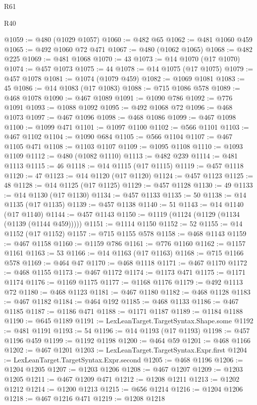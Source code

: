 \begin{lexlean}{R61}
\begin{lexlean}{R40}
\begin{coremodule}
{{{{{{{{{{{{{{{{{{{{{{{{{{{{{{{{{{{{{{{{{{{{{{{{{{{{{{{{{{{{{{{{{{{{{{{{{{{{{{{{{{{{{{{{{{{{{{{{{{{{{{{{{{{{{@1059 := @480 (@1029 @1057)
@1060 := @482 @65
@1062 := @481 @1060 @459
@1065 := @492 @1060 @72 @471
@1067 := @480 (@1062 @1065)
@1068 := @482 @225
@1069 := @481 @1068
@1070 := 43
@1073 := @14 @1070 (@17 @1070)
@1074 := @457 @1073
@1075 := 44
@1078 := @14 @1075 (@17 @1075)
@1079 := @457 @1078
@1081 := @1074 (@1079 @459)
@1082 := @1069 @1081
@1083 := 45
@1086 := @14 @1083 (@17 @1083)
@1088 := @715 @1086 @578
@1089 := @468 @1078
@1090 := @467 @1089
@1091 := @1090 @786
@1092 := @776 @1091
@1093 := @1088 @1092
@1095 := @492 @1068 @72
@1096 := @468 @1073
@1097 := @467 @1096
@1098 := @468 @1086
@1099 := @467 @1098
@1100 := @1099 @471
@1101 := @1097 @1100
@1102 := @566 @1101
@1103 := @467 @1102
@1104 := @1090 @684
@1105 := @566 @1104
@1107 := @467 @1105 @471
@1108 := @1103 @1107
@1109 := @1095 @1108
@1110 := @1093 @1109
@1112 := @480 (@1082 @1110)
@1113 := @482 @239
@1114 := @481 @1113
@1115 := 46
@1118 := @14 @1115 (@17 @1115)
@1119 := @457 @1118
@1120 := 47
@1123 := @14 @1120 (@17 @1120)
@1124 := @457 @1123
@1125 := 48
@1128 := @14 @1125 (@17 @1125)
@1129 := @457 @1128
@1130 := 49
@1133 := @14 @1130 (@17 @1130)
@1134 := @457 @1133
@1135 := 50
@1138 := @14 @1135 (@17 @1135)
@1139 := @457 @1138
@1140 := 51
@1143 := @14 @1140 (@17 @1140)
@1144 := @457 @1143
@1150 := @1119 (@1124 (@1129 (@1134 (@1139 (@1144 @459)))))
@1151 := @1114 @1150
@1152 := 52
@1155 := @14 @1152 (@17 @1152)
@1157 := @715 @1155 @578
@1158 := @468 @1143
@1159 := @467 @1158
@1160 := @1159 @786
@1161 := @776 @1160
@1162 := @1157 @1161
@1163 := 53
@1166 := @14 @1163 (@17 @1163)
@1168 := @715 @1166 @578
@1169 := @464 @47
@1170 := @468 @1118
@1171 := @467 @1170
@1172 := @468 @1155
@1173 := @467 @1172
@1174 := @1173 @471
@1175 := @1171 @1174
@1176 := @1169 @1175
@1177 := @1168 @1176
@1179 := @492 @1113 @72
@1180 := @468 @1123
@1181 := @467 @1180
@1182 := @468 @1128
@1183 := @467 @1182
@1184 := @464 @192
@1185 := @468 @1133
@1186 := @467 @1185
@1187 := @1186 @471
@1188 := @1171 @1187
@1189 := @1184 @1188
@1190 := @645 @1189
@1191 := LexLeanTarget.TargetSyntax.Shape.some
@1192 := @481 @1191
@1193 := 54
@1196 := @14 @1193 (@17 @1193)
@1198 := @457 @1196 @459
@1199 := @1192 @1198
@1200 := @464 @59
@1201 := @468 @1166
@1202 := @467 @1201
@1203 := LexLeanTarget.TargetSyntax.Expr.first
@1204 := LexLeanTarget.TargetSyntax.Expr.second
@1205 := @468 @1196
@1206 := @1204 @1205
@1207 := @1203 @1206
@1208 := @467 @1207
@1209 := @1203 @1205
@1211 := @467 @1209 @471
@1212 := @1208 @1211
@1213 := @1202 @1212
@1214 := @1200 @1213
@1215 := @656 @1214
@1216 := @1204 @1206
@1218 := @467 @1216 @471
@1219 := @1208 @1218
}}}}}}}}}}}}}}}}}}}}}}}}}}}}}}}}}}}}}}}}}}}}}}}}}}}}}}}}}}}}}}}}}}}}}}}}}}}}}}}}}}}}}}}}}}}}}}}}}}}}}}}}}}}}}
\end{coremodule}
\end{lexlean}
\end{lexlean}
